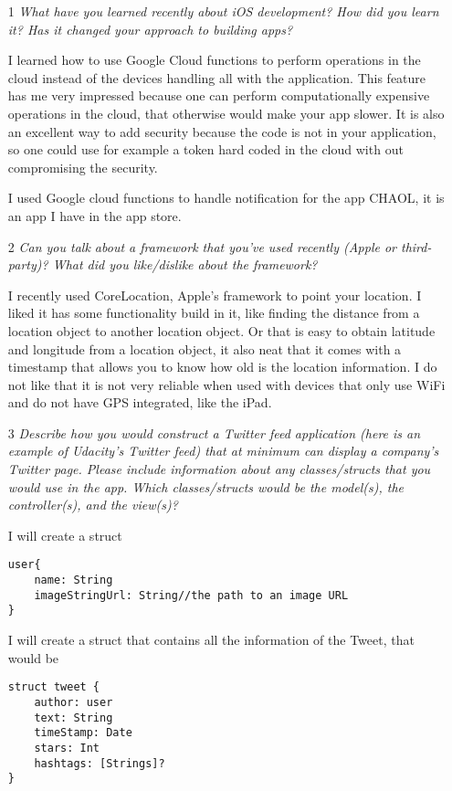 \documentclass[12]{report}
\begin{document}
\begin{itemize}
\item[1] {\it What have you learned recently about iOS development? How did you learn it? Has it changed your approach to building apps? }

I learned how to use Google Cloud functions to perform operations in the cloud instead of the devices handling all with the application. This feature has me very impressed because one can perform computationally expensive operations in the cloud, that otherwise would make your app slower. It is also an excellent way to add security because the code is not in your application, so one could use for example a token hard coded in the cloud with out compromising the security. 

I used Google cloud functions to handle notification for the app CHAOL, it is an app I have in the app store. 

\item[2] {\it Can you talk about a framework that you've used recently (Apple or third-party)? What did you like/dislike about the framework?}

I recently used CoreLocation, Apple's framework to point your location. I liked it has some functionality build in it, like finding the distance from a location object to another location object.  Or that is easy to obtain latitude and longitude from a location object, it also neat that it comes with a timestamp that allows you to know how old is the location information. I do not like that it is not very reliable when used with devices that only use WiFi and do not have GPS integrated, like the iPad.

\item[3] {\it Describe how you would construct a Twitter feed application (here is an example of Udacity's Twitter feed) that at minimum can display a company's Twitter page. Please include information about any classes/structs that you would use in the app. Which classes/structs would be the model(s), the controller(s), and the view(s)?}

I will create a struct 
\begin{verbatim}
user{ 
    name: String 
    imageStringUrl: String//the path to an image URL              
}
\end{verbatim}

I will create a struct that contains all the information of the Tweet, that would be 

\begin{verbatim}
struct tweet { 
    author: user
    text: String 
    timeStamp: Date
    stars: Int
    hashtags: [Strings]?  
}
\end{verbatim}


\end{itemize}
\end{document}

